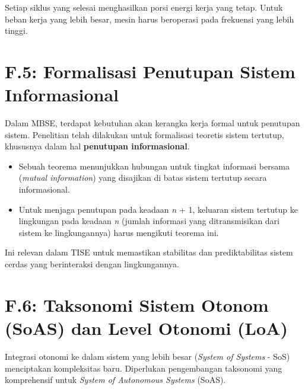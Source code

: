 \documentclass[
  letterpaper,
  DIV=11,
  numbers=noendperiod]{scrreprt}
\providecommand{\tightlist}{%
  \setlength{\itemsep}{0pt}\setlength{\parskip}{0pt}}
\begin{document}
Setiap siklus yang selesai menghasilkan porsi energi kerja yang tetap.
Untuk beban kerja yang lebih besar, mesin harus beroperasi pada
frekuensi yang lebih tinggi.

\section{\texorpdfstring{\textbf{F.5: Formalisasi Penutupan Sistem
Informasional}}{F.5: Formalisasi Penutupan Sistem Informasional}}\label{f.5-formalisasi-penutupan-sistem-informasional}

Dalam MBSE, terdapat kebutuhan akan kerangka kerja formal untuk
penutupan sistem. Penelitian telah dilakukan untuk formalisasi teoretis
sistem tertutup, khususnya dalam hal \textbf{penutupan informasional}.

\begin{itemize}
\tightlist
\item
  Sebuah teorema menunjukkan hubungan untuk tingkat informasi bersama
  (\emph{mutual information}) yang disajikan di batas sistem tertutup
  secara informasional.
\item
  Untuk menjaga penutupan pada keadaan \emph{n} + 1, keluaran sistem
  tertutup ke lingkungan pada keadaan \emph{n} (jumlah informasi yang
  ditransmisikan dari sistem ke lingkungannya) harus mengikuti teorema
  ini.
\end{itemize}

Ini relevan dalam TISE untuk memastikan stabilitas dan prediktabilitas
sistem cerdas yang berinteraksi dengan lingkungannya.

\section{\texorpdfstring{\textbf{F.6: Taksonomi Sistem Otonom (SoAS) dan
Level Otonomi
(LoA)}}{F.6: Taksonomi Sistem Otonom (SoAS) dan Level Otonomi (LoA)}}\label{f.6-taksonomi-sistem-otonom-soas-dan-level-otonomi-loa}

Integrasi otonomi ke dalam sistem yang lebih besar (\emph{System of
Systems} - SoS) menciptakan kompleksitas baru. Diperlukan pengembangan
taksonomi yang komprehensif untuk \emph{System of Autonomous Systems}
(SoAS).
\end{document}
